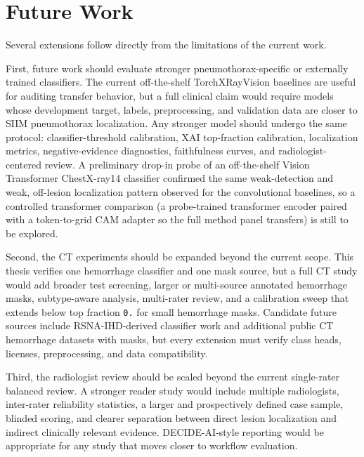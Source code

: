 \hypertarget{future-work}{%
	\section{Future Work}\label{future-work}}

Several extensions follow directly from the limitations of the current
work.

First, future work should evaluate stronger pneumothorax-specific or
externally trained classifiers. The current off-the-shelf
TorchXRayVision baselines are useful for auditing transfer behavior, but
a full clinical claim would require models whose development target,
labels, preprocessing, and validation data are closer to SIIM
pneumothorax localization. Any stronger model should undergo the same
protocol: classifier-threshold calibration, XAI top-fraction
calibration, localization metrics, negative-evidence
diagnostics, faithfulness curves, and radiologist-centered review. A
preliminary drop-in probe of an off-the-shelf Vision Transformer
\cite{ref-vit} ChestX-ray14 \cite{ref-chestxray8} classifier confirmed
the same weak-detection and weak, off-lesion localization pattern
observed for the convolutional baselines, so a controlled transformer
comparison (a probe-trained transformer encoder paired with a
token-to-grid CAM adapter so the full method panel transfers) is still 
to be explored.

Second, the CT experiments should be expanded beyond the current 
scope. This thesis verifies one hemorrhage classifier and one mask
source, but a full CT study would add broader test screening, larger or
multi-source annotated hemorrhage masks, subtype-aware analysis,
multi-rater review, and a calibration sweep that extends below top
fraction \texttt{0.} for small hemorrhage masks. Candidate future
sources include RSNA-IHD-derived classifier work \cite{ref-rsna-ihd} and
additional public CT hemorrhage datasets with masks, but every extension
must verify class heads, licenses, preprocessing, and data compatibility.

Third, the radiologist review should be scaled beyond the current
single-rater balanced review. A stronger reader study would include
multiple radiologists, inter-rater reliability statistics, a larger and
prospectively defined case sample, blinded scoring, and clearer
separation between direct lesion localization and indirect clinically
relevant evidence. DECIDE-AI-style reporting \cite{ref-decide-ai} would
be appropriate for any study that moves closer to workflow evaluation.

